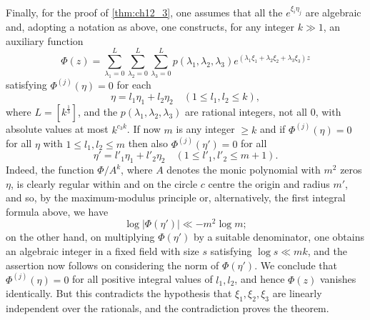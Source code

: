 Finally, for the proof of \autoref{thm:ch12_3}, one assumes that all the $e^{\xi_i\eta_j}$ are algebraic and, adopting a notation as above, one constructs, for any integer $k \gg 1$, an auxiliary function
\[\Phi(z) = \sum_{\lambda_1=0}^{L} \sum_{\lambda_2=0}^{L} \sum_{\lambda_3=0}^{L} p(\lambda_1, \lambda_2, \lambda_3) e^{(\lambda_1 \xi_1 + \lambda_2 \xi_2 + \lambda_3 \xi_3) z}\]
satisfying $\Phi^{(j)}(\eta) = 0$ for each
\[\eta = l_1 \eta_1 + l_2 \eta_2 \quad (1 \leqslant l_1, l_2 \leqslant k),\]
where $L = [k^{\frac{1}{3}}]$, and the $p(\lambda_1, \lambda_2, \lambda_3)$ are rational integers, not all 0, with absolute values at most $k^{c_3 k}$. If now $m$ is any integer $\ge k$ and if $\Phi^{(j)}(\eta) = 0$ for all $\eta$ with $1 \le l_1, l_2 \le m$ then also $\Phi^{(j)}(\eta') = 0$ for all
\[\eta' = l'_1 \eta_1 + l'_2 \eta_2 \quad (1 \leqslant l'_1, l'_2 \leqslant m+1).\]
Indeed, the function $\Phi/A^k$, where $A$ denotes the monic polynomial with $m^2$ zeros $\eta$, is clearly regular within and on the circle $c$ centre the origin and radius $m'$, and so, by the maximum-modulus principle or, alternatively, the first integral formula above, we have
\[\log |\Phi(\eta')| \ll -m^2 \log m;\]
on the other hand, on multiplying $\Phi(\eta')$ by a suitable denominator, one obtains an algebraic integer in a fixed field with size $s$ satisfying $\log s \ll m k$, and the assertion now follows on considering the norm of $\Phi(\eta')$. We conclude that $\Phi^{(j)}(\eta) = 0$ for all positive integral values of $l_1, l_2$, and hence $\Phi(z)$ vanishes identically. But this contradicts the hypothesis that $\xi_1, \xi_2, \xi_3$ are linearly independent over the rationals, and the contradiction proves the theorem.
